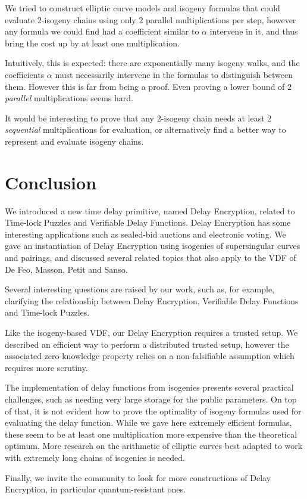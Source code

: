 \documentclass{llncs}
\begin{document}
We tried to construct elliptic curve models and isogeny formulas that
could evaluate $2$-isogeny chains using only $2$ parallel
multiplications per step, however any formula we could find had a
coefficient similar to $\alpha$ intervene in it, and thus bring the
cost up by at least one multiplication.

Intuitively, this is expected: there are exponentially many isogeny
walks, and the coefficients $\alpha$ must necessarily intervene in the
formulas to distinguish between them. %
However this is far from being a proof. %
Even proving a lower bound of $2$ \emph{parallel} multiplications
seems hard.

It would be interesting to prove that any $2$-isogeny chain needs at
least $2$ \emph{sequential} multiplications for evaluation, or
alternatively find a better way to represent and evaluate isogeny
chains.


\section{Conclusion}

We introduced a new time delay primitive, named Delay Encryption,
related to Time-lock Puzzles and Verifiable Delay Functions. %
Delay Encryption has some interesting applications such as sealed-bid
auctions and electronic voting. %
We gave an instantiation of Delay Encryption using isogenies of
supersingular curves and pairings, and discussed several related
topics that also apply to the VDF of De Feo, Masson, Petit and Sanso.

Several interesting questions are raised by our work, such as, for
example, clarifying the relationship between Delay Encryption,
Verifiable Delay Functions and Time-lock Puzzles.

Like the isogeny-based VDF, our Delay Encryption requires a trusted
setup. %
We described an efficient way to perform a distributed trusted setup,
however the associated zero-knowledge property relies on a
non-falsifiable assumption which requires more scrutiny.

The implementation of delay functions from isogenies presents several
practical challenges, such as needing very large storage for the
public parameters. %
On top of that, it is not evident how to prove the optimality of
isogeny formulas used for evaluating the delay function. %
While we gave here extremely efficient formulas, these seem to be at
least one multiplication more expensive than the theoretical
optimum. %
More research on the arithmetic of elliptic curves best adapted to
work with extremely long chains of isogenies is needed.

Finally, we invite the community to look for more constructions of
Delay Encryption, in particular quantum-resistant ones.

\def\doi#1{\href{https://doi.org/#1}{\tt https://doi.org/\nolinkurl{#1}}}


\end{document}
